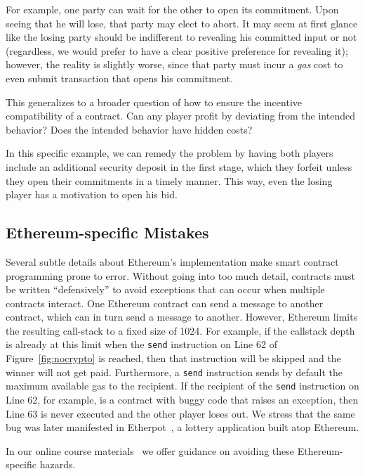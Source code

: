 \documentclass{llncs}
\begin{document}
For example, one party can 
wait for the other to open its commitment. Upon
seeing that he will lose, that party may elect
to abort. 
It may seem at first glance like the losing party should be indifferent to revealing his committed input or not (regardless, we would prefer to have a clear positive preference for revealing it); however, the reality is slightly worse, since that party must incur a \emph{gas} cost to even submit transaction that opens his commitment.

This generalizes to a broader question of how to 
ensure the incentive compatibility of a contract.
Can any player profit by deviating from the intended behavior?
Does the intended behavior have hidden costs?

In this specific example, we can remedy the problem
by having both players include an additional security deposit in the first stage,
which they forfeit unless they open their commitments in a timely manner.
This way, even the losing player has a motivation to open his bid.

\subsection{Ethereum-specific Mistakes}
Several subtle details about Ethereum's implementation make smart contract programming prone to error. Without going into too much detail, contracts must be written ``defensively'' to avoid exceptions that can occur when multiple contracts interact. One Ethereum contract can send a message to another contract, which can in turn send a message to another. However, Ethereum limits the resulting call-stack to a fixed size of 1024. For example, if the callstack depth is already at this limit when the \texttt{send} instruction on Line 62 of Figure~\ref{fig:nocrypto} is reached, then that instruction will be skipped and the winner will not get paid. Furthermore, a \texttt{send} instruction sends by default the maximum available gas to the recipient. If the recipient of the \texttt{send} instruction on Line 62, for example, is a contract with buggy code that raises an exception, then Line 63 is never executed and the other player loses out. 
We stress that 
the same 
bug was later manifested in Etherpot~\cite{etherpot}, a lottery application built atop Ethereum.

In our online course materials~\cite{anonymousethlab} we offer guidance on avoiding these Ethereum-specific hazards.
\end{document}
